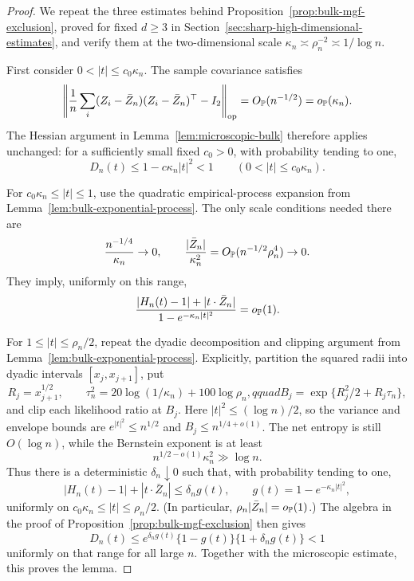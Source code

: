 \begin{proof}
We repeat the three estimates behind
Proposition~\ref{prop:bulk-mgf-exclusion}, proved for fixed \(d\ge3\) in
Section~\ref{sec:sharp-high-dimensional-estimates}, and verify them at the
two-dimensional scale
\(\kappa_n\asymp\rho_n^{-2}\asymp1/\log n\).

First consider \(0<|t|\le c_0\kappa_n\). The sample covariance satisfies
\[
    \left\|\frac1n\sum_i
    (Z_i-\bar Z_n)(Z_i-\bar Z_n)^\top-I_2\right\|_{\mathrm{op}}
    =O_{\mathbb P}(n^{-1/2})
    =o_{\mathbb P}(\kappa_n).
\]
The Hessian argument in Lemma~\ref{lem:microscopic-bulk} therefore applies
unchanged: for a sufficiently small fixed \(c_0>0\), with probability tending
to one,
\[
    D_n(t)\le1-c\kappa_n|t|^2<1
    \qquad(0<|t|\le c_0\kappa_n).
\]

For \(c_0\kappa_n\le |t|\le1\), use the quadratic empirical-process
expansion from Lemma~\ref{lem:bulk-exponential-process}. The only scale
conditions needed there are
\[
    \frac{n^{-1/4}}{\kappa_n}\to0,
    \qquad
    \frac{|\bar Z_n|}{\kappa_n^2}
    =
    O_{\mathbb P}(n^{-1/2}\rho_n^4)\to0 .
\]
They imply, uniformly on this range,
\[
    \frac{|H_n(t)-1|+|t\cdot\bar Z_n|}
         {1-e^{-\kappa_n|t|^2}}
    =o_{\mathbb P}(1).
\]

For \(1\le |t|\le\rho_n/2\), repeat the dyadic decomposition and clipping
argument from Lemma~\ref{lem:bulk-exponential-process}. Explicitly, partition the squared radii into
dyadic intervals \([x_j,x_{j+1}]\), put
\[
 R_j=x_{j+1}^{1/2},\qquad
 \tau_n^2=20\log(1/\kappa_n)+100\log\rho_n,qquad
 B_j=\exp\{R_j^2/2+R_j\tau_n\},
\]
and clip each likelihood ratio at \(B_j\). Here
\(|t|^2\le(\log n)/2\), so the variance and envelope bounds are
\(e^{|t|^2}\le n^{1/2}\) and \(B_j\le n^{1/4+o(1)}\). The net entropy is
still \(O(\log n)\), while the
Bernstein exponent is at least
\[
    n^{1/2-o(1)}\kappa_n^2
    \gg \log n .
\]
Thus there is a deterministic \(\delta_n\downarrow0\) such that, with
probability tending to one,
\[
    |H_n(t)-1|+|t\cdot\bar Z_n|
    \le\delta_n g(t),
    \qquad
    g(t)=1-e^{-\kappa_n|t|^2},
\]
uniformly on \(c_0\kappa_n\le|t|\le\rho_n/2\). (In particular,
\(\rho_n|\bar Z_n|=o_{\mathbb P}(1)\).) The algebra in the proof of
Proposition~\ref{prop:bulk-mgf-exclusion} then gives
\[
    D_n(t)
    \le e^{\delta_ng(t)}\{1-g(t)\}\{1+\delta_ng(t)\}
    <1
\]
uniformly on that range for all large \(n\). Together with the microscopic
estimate, this proves the lemma.
\end{proof}

